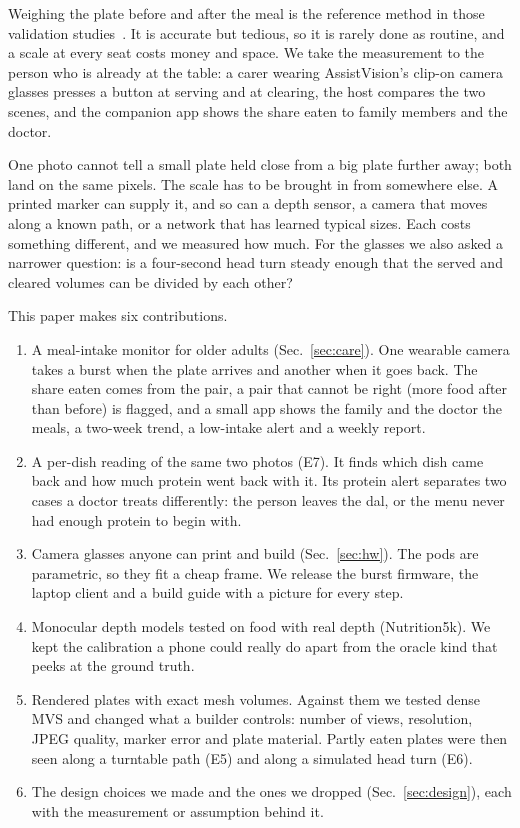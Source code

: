 \documentclass[conference]{IEEEtran}
\begin{document}
Weighing the plate before and after the meal is the reference method in those
validation studies~\cite{kawasaki2016criterion}. It is accurate but tedious,
so it is rarely done as routine, and a scale at every seat costs money and
space. We take the measurement to the person who is already at the table: a
carer wearing AssistVision's clip-on camera glasses presses a button at
serving and at clearing, the host compares the two scenes, and the companion
app shows the share eaten to family members and the doctor.

One photo cannot tell a small plate held close from a big plate further away;
both land on the same pixels. The scale has to be brought in from somewhere
else. A printed marker can supply it, and so can a depth sensor, a camera that
moves along a known path, or a network that has learned typical sizes. Each
costs something different, and we measured how much. For the glasses we also
asked a narrower question: is a four-second head turn steady enough that the
served and cleared volumes can be divided by each other?

This paper makes six contributions.
\begin{enumerate}
\item A meal-intake monitor for older adults (Sec.~\ref{sec:care}). One
wearable camera takes a burst when the plate arrives and another when it goes
back. The share eaten comes from the pair, a pair that cannot be right (more
food after than before) is flagged, and a small app shows the family and the
doctor the meals, a two-week trend, a low-intake alert and a weekly report.
\item A per-dish reading of the same two photos (E7). It finds which dish came
back and how much protein went back with it. Its protein alert separates two
cases a doctor treats differently: the person leaves the dal, or the menu
never had enough protein to begin with.
\item Camera glasses anyone can print and build (Sec.~\ref{sec:hw}). The pods
are parametric, so they fit a cheap frame. We release the burst firmware, the
laptop client and a build guide with a picture for every step.
\item Monocular depth models tested on food with real depth (Nutrition5k). We
kept the calibration a phone could really do apart from the oracle kind that
peeks at the ground truth.
\item Rendered plates with exact mesh volumes. Against them we tested dense MVS
and changed what a builder controls: number of views, resolution, JPEG quality,
marker error and plate material. Partly eaten plates were then seen along a
turntable path (E5) and along a simulated head turn (E6).
\item The design choices we made and the ones we dropped
(Sec.~\ref{sec:design}), each with the measurement or assumption behind it.
\end{enumerate}
\end{document}
